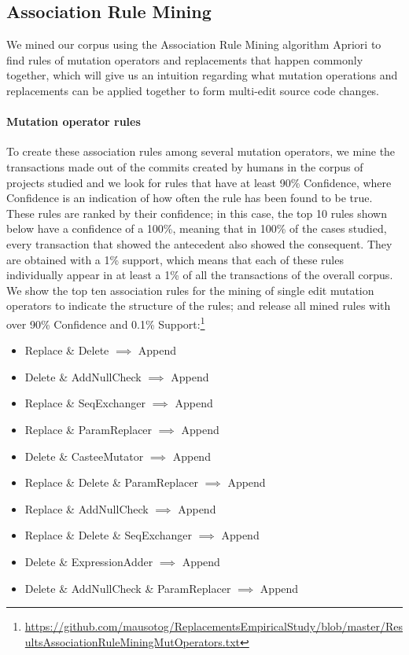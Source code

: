 \documentclass[conference]{IEEEtran}
\begin{document}
\subsection{Association Rule Mining} \label{armRes}

We mined our corpus using the Association Rule Mining algorithm Apriori 
to find rules of mutation operators and 
replacements that happen commonly together, which will give us an intuition regarding
what mutation operations and replacements can be applied together to form multi-edit
source code changes.

\paragraph{Mutation operator rules}
To create these association rules among several mutation operators, we mine the
transactions made out of the commits created by humans in the corpus of projects
studied and we look for rules that have at least 90\% Confidence, where
Confidence is an indication of how often the rule has been found to be true.  
These rules are ranked by their confidence; in this case, the top 10 rules shown
below have a confidence of a 100\%, meaning that in 100\% of the cases
studied, every transaction that showed the antecedent also showed the consequent.
They are obtained with a 1\% support, which means that each of these rules
individually appear in at least a 1\% of all the transactions of the overall
corpus. We show the top ten association rules for the mining of single edit 
mutation operators to indicate the structure of the rules; and release all mined
rules with over 90\% Confidence and 0.1\% Support:\footnote{\url{https://github.com/mausotog/ReplacementsEmpiricalStudy/blob/master/ResultsAssociationRuleMiningMutOperators.txt}} 


\begin{itemize}
\item Replace \& Delete $\implies$ Append
\item Delete \& AddNullCheck $\implies$ Append
\item Replace \& SeqExchanger $\implies$ Append
\item Replace \& ParamReplacer $\implies$ Append
\item Delete \& CasteeMutator $\implies$ Append
\item Replace \& Delete \& ParamReplacer $\implies$ Append
\item Replace \& AddNullCheck $\implies$ Append
\item Replace \& Delete \& SeqExchanger $\implies$ Append
\item Delete \& ExpressionAdder $\implies$ Append
\item Delete \& AddNullCheck \& ParamReplacer $\implies$ Append
\end{itemize}
\end{document}
